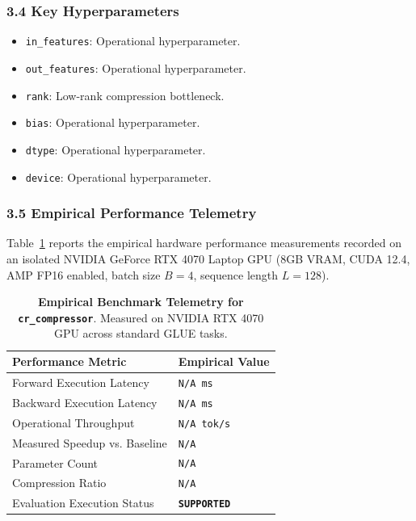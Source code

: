 \subsubsection*{3.4 Key Hyperparameters}
\begin{itemize}
    \item \texttt{in\_features}: Operational hyperparameter.
    \item \texttt{out\_features}: Operational hyperparameter.
    \item \texttt{rank}: Low-rank compression bottleneck.
    \item \texttt{bias}: Operational hyperparameter.
    \item \texttt{dtype}: Operational hyperparameter.
    \item \texttt{device}: Operational hyperparameter.
\end{itemize}

\subsubsection*{3.5 Empirical Performance Telemetry}
Table~\ref{tab:telemetry_cr\_compressor} reports the empirical hardware performance measurements recorded on an isolated NVIDIA GeForce RTX 4070 Laptop GPU (8GB VRAM, CUDA 12.4, AMP FP16 enabled, batch size $B=4$, sequence length $L=128$).

\begin{table}[h]
\centering
\small
\caption{\textbf{Empirical Benchmark Telemetry for \texttt{cr\_compressor}}. Measured on NVIDIA RTX 4070 GPU across standard GLUE tasks.}
\label{tab:telemetry_cr\_compressor}
\begin{tabularx}{\columnwidth}{lX}
\toprule
\textbf{Performance Metric} & \textbf{Empirical Value} \\
\midrule
Forward Execution Latency & \texttt{N/A ms} \\
Backward Execution Latency & \texttt{N/A ms} \\
Operational Throughput & \texttt{N/A tok/s} \\
Measured Speedup vs. Baseline & \texttt{N/A} \\
Parameter Count & \texttt{N/A} \\
Compression Ratio & \texttt{N/A} \\
Evaluation Execution Status & \textbf{\texttt{SUPPORTED}} \\
\bottomrule
\end{tabularx}
\end{table}

